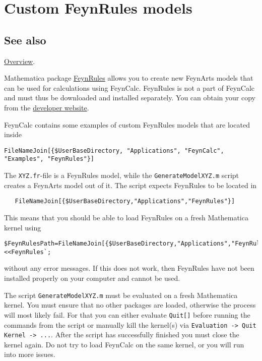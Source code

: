 \documentclass[../FeynCalcManual.tex]{subfiles}
\begin{document}
\hypertarget{custom feynrules models}{
\section{Custom FeynRules models}\label{custom feynrules models}}

\subsection{See also}

\hyperlink{toc}{Overview}.

Mathematica package \href{https://feynrules.irmp.ucl.ac.be/}{FeynRules}
allows you to create new FeynArts models that can be used for
calculations using FeynCalc. FeynRules is not a part of FeynCalc and
must thus be downloaded and installed separately. You can obtain your
copy from the \href{https://feynrules.irmp.ucl.ac.be/}{developer
website}.

FeynCalc contains some examples of custom FeynRules models that are
located inside

\begin{verbatim}
FileNameJoin[{$UserBaseDirectory, "Applications", "FeynCalc", "Examples", "FeynRules"}]
\end{verbatim}

The \texttt{XYZ.fr}-file is a FeynRules model, while the
\texttt{GenerateModelXYZ.m} script creates a FeynArts model out of it.
The script expects FeynRules to be located in

\begin{verbatim}
   FileNameJoin[{$UserBaseDirectory,"Applications","FeynRules"}]
\end{verbatim}

This means that you should be able to load FeynRules on a fresh
Mathematica kernel using

\begin{verbatim}
$FeynRulesPath=FileNameJoin[{$UserBaseDirectory,"Applications","FeynRules"}];
<<FeynRules`;
\end{verbatim}

without any error messages. If this does not work, then FeynRules have
not been installed properly on your computer and cannot be used.

The script \texttt{GenerateModelXYZ.m} must be evaluated on a fresh
Mathematica kernel. You must ensure that no other packages are loaded,
otherwise the process will most likely fail. For that you can either
evaluate \texttt{Quit[\allowbreak{}]} before running the commands from
the script or manually kill the kernel(s) via
\texttt{Evaluation -> Quit Kernel -> ...}. After the script has
successfully finished you must close the kernel again. Do not try to
load FeynCalc on the same kernel, or you will run into more issues.
\end{document}
